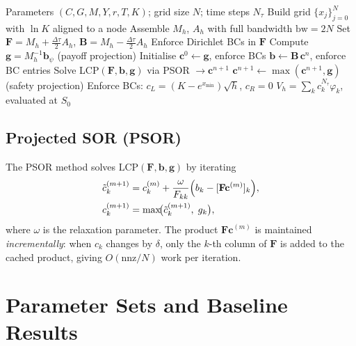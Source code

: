 \documentclass[11pt,a4paper]{article}
\begin{document}
\begin{algorithm}[H]
\caption{American Put: CN + Projected SOR}
\begin{algorithmic}[1]
\Require Parameters $(C,G,M,Y,r,T,K)$; grid size $N$; time steps $N_\tau$
\State Build grid $\{x_j\}_{j=0}^N$ with $\ln K$ aligned to a node
\State Assemble $M_h$, $A_h$ with full bandwidth $\mathrm{bw}=2N$
\State Set $\mathbf{F} = M_h + \tfrac{\Delta\tau}{2}A_h$,\;
       $\mathbf{B} = M_h - \tfrac{\Delta\tau}{2}A_h$
\State Enforce Dirichlet BCs in $\mathbf{F}$
\State Compute $\mathbf{g} = M_h^{-1}\mathbf{b}_\psi$ \quad (payoff projection)
\State Initialise $\mathbf{c}^0 \leftarrow \mathbf{g}$, enforce BCs
  \State $\mathbf{b} \leftarrow \mathbf{B}\,\mathbf{c}^n$, enforce BC entries
  \State Solve LCP$(\mathbf{F},\mathbf{b},\mathbf{g})$ via PSOR $\to \mathbf{c}^{n+1}$
  \State $\mathbf{c}^{n+1} \leftarrow \max(\mathbf{c}^{n+1}, \mathbf{g})$ \quad (safety projection)
  \State Enforce BCs: $c_L = (K-e^{x_{\min}})\sqrt{h}$, $c_R=0$
\EndFor
\State \Return $V_h = \sum_k c^{N_\tau}_k \varphi_k$, evaluated at $S_0$
\end{algorithmic}
\end{algorithm}

\subsection{Projected SOR (PSOR)}

The PSOR method solves $\mathrm{LCP}(\mathbf{F},\mathbf{b},\mathbf{g})$ by
iterating
\begin{align}
  \tilde c_k^{(m+1)} &= c_k^{(m)} +
    \frac{\omega}{F_{kk}}\Bigl(b_k - [\mathbf{F}\mathbf{c}^{(m)}]_k\Bigr), \\
  c_k^{(m+1)} &= \max\!\bigl(\tilde c_k^{(m+1)},\; g_k\bigr),
\end{align}
where $\omega$ is the relaxation parameter. The product $\mathbf{Fc}^{(m)}$
is maintained \emph{incrementally}: when $c_k$ changes by $\delta$, only the
$k$-th column of $\mathbf{F}$ is added to the cached product, giving
$O(\mathrm{nnz}/N)$ work per iteration.

\section{Parameter Sets and Baseline Results}
\end{document}
